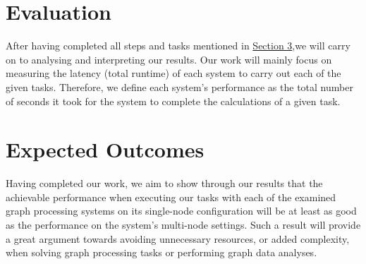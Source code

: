 \documentclass[a4paper,11pt]{article}
\begin{document}

\section{Evaluation} \label{evaluation}

\par After having completed all steps and tasks mentioned in \hyperref[methodology]{Section 3},we will carry on to analysing and interpreting our results. Our work will mainly focus on measuring the latency (total runtime) of each system to carry out each of the given tasks. Therefore, we define each system's performance as the total number of seconds it took for the system to complete the calculations of a given task.


\section{Expected Outcomes} \label{outcomes}

\par Having completed our work, we aim to show through our results that the achievable performance when executing our tasks with each of the examined graph processing systems on its single-node configuration will be at least as good as the performance on the system's multi-node settings. Such a result will provide a great argument towards avoiding unnecessary resources, or added complexity, when solving graph processing tasks or performing graph data analyses.
\end{document}
